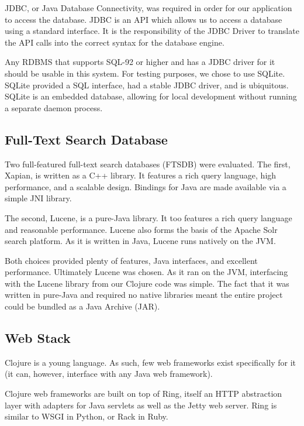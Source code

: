 \documentclass[12pt,letterpaper,oneside]{report}
\theoremstyle{definition}
\begin{document}
				JDBC, or Java Database Connectivity, was required in order for our application to access the database.  JDBC is an API which allows us to access a database using a standard interface.  It is the responsibility of the JDBC Driver to translate the API calls into the correct syntax for the database engine.
				
				Any RDBMS that supports SQL-92 or higher and has a JDBC driver for it should be usable in this system.  For testing purposes, we chose to use SQLite.  SQLite provided a SQL interface, had a stable JDBC driver, and is ubiquitous.  SQLite is an embedded database, allowing for local development without running a separate daemon process.
			
			\subsection{Full-Text Search Database}
				Two full-featured full-text search databases (FTSDB) were evaluated.  The first, Xapian, is written as a C++ library.  It features a rich query language, high performance, and a scalable design\cite{xapian}.  Bindings for Java are made available via a simple JNI library.
				
				The second, Lucene, is a pure-Java library.  It too features a rich query language and reasonable performance.  Lucene also forms the basis of the Apache Solr search platform.  As it is written in Java, Lucene runs natively on the JVM.
				
				Both choices provided plenty of features, Java interfaces, and excellent performance.  Ultimately Lucene was chosen.  As it ran on the JVM, interfacing with the Lucene library from our Clojure code was simple.  The fact that it was written in pure-Java and required no native libraries meant the entire project could be bundled as a Java Archive (JAR).
			
			\subsection{Web Stack}
				Clojure is a young language.  As such, few web frameworks exist specifically for it (it can, however, interface with any Java web framework).  
				
				Clojure web frameworks are built on top of Ring, itself an HTTP abstraction layer with adapters for Java servlets as well as the Jetty web server.  Ring is similar to WSGI in Python, or Rack in Ruby.
				
\end{document}
